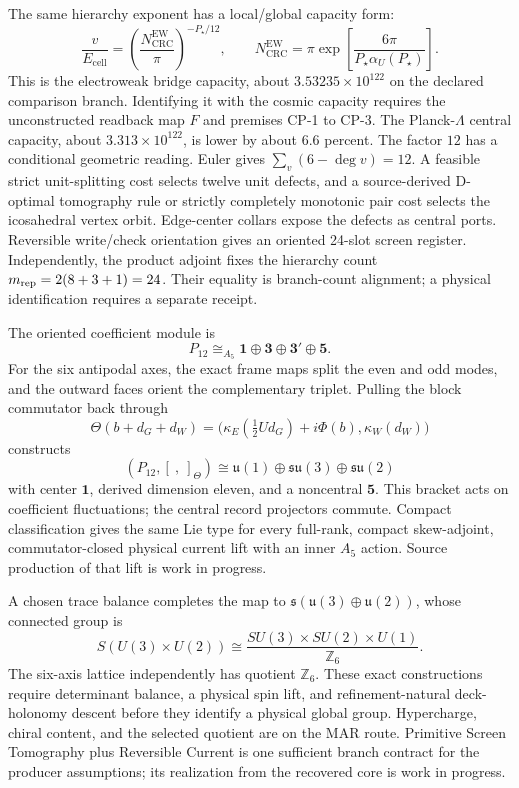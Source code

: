 \documentclass[11pt]{article}
\begin{document}
The same hierarchy exponent has a local/global capacity form:
\[
\frac{v}{E_{\mathrm{cell}}}
=
\left(\frac{N_{\mathrm{CRC}}^{\mathrm{EW}}}{\pi}\right)^{-P_\star/12},
\qquad
N_{\mathrm{CRC}}^{\mathrm{EW}}
=
\pi\exp\!\left[\frac{6\pi}{P_\star\alpha_U(P_\star)}\right].
\]
This is the electroweak bridge capacity, about
\(3.53235\times10^{122}\) on the declared comparison branch. Identifying it with the cosmic
capacity requires the unconstructed readback map \(F\) and premises CP-1 to CP-3. The
Planck-\(\Lambda\) central capacity, about \(3.313\times10^{122}\), is lower by about \(6.6\)
percent. The factor \(12\) has a conditional geometric reading. Euler gives
\(\sum_v(6-\deg v)=12\). A feasible strict unit-splitting cost selects twelve
unit defects, and a source-derived D-optimal tomography rule or strictly
completely monotonic pair cost selects the icosahedral vertex orbit. Edge-center
collars expose the defects as central ports. Reversible write/check orientation
gives an oriented 24-slot screen register. Independently, the product adjoint fixes the
hierarchy count \(m_{\rm rep}=2(8+3+1)=24\). Their equality is branch-count alignment;
a physical identification requires a separate receipt.

The oriented coefficient module is
\[
 P_{12}\cong_{A_5}\mathbf1\oplus\mathbf3\oplus\mathbf3'\oplus\mathbf5.
\]
For the six antipodal axes, the exact frame maps split the even and odd modes,
and the outward faces orient the complementary triplet. Pulling the block
commutator back through
\[
 \Theta(b+d_G+d_W)=
 \bigl(\kappa_E(\tfrac12Ud_G)+i\Phi(b),\kappa_W(d_W)\bigr)
\]
constructs
\[
 (P_{12},[\ ,\ ]_\Theta)\cong
 \mathfrak u(1)\oplus\mathfrak{su}(3)\oplus\mathfrak{su}(2)
\]
with center \(\mathbf1\), derived dimension eleven, and a noncentral
\(\mathbf5\). This bracket acts on coefficient fluctuations; the central
record projectors commute. Compact classification gives the same Lie type for
every full-rank, compact skew-adjoint, commutator-closed physical current lift
with an inner \(A_5\) action. Source production of that lift is work in
progress.

A chosen trace balance completes the map to
\(\mathfrak{s}(\mathfrak u(3)\oplus\mathfrak u(2))\), whose connected group is
\[
 S(U(3)\times U(2))
 \cong\frac{SU(3)\times SU(2)\times U(1)}{\mathbb Z_6}.
\]
The six-axis lattice independently has quotient \(\mathbb Z_6\). These exact
constructions require determinant balance, a physical spin lift, and
refinement-natural deck-holonomy descent before they identify a physical
global group. Hypercharge, chiral content, and the selected quotient are on
the MAR route. Primitive Screen Tomography plus Reversible Current is one
sufficient branch contract for the producer assumptions; its realization from
the recovered core is work in progress.
\end{document}
